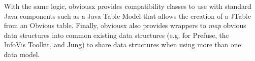 With the same logic, obviousx provides compatibility classes to use
with standard Java components such as a Java Table Model that allows
the creation of a JTable from an Obvious table.  Finally, obviousx
also provides wrappers to \emph{map} obvious data structures into
common existing data structures (e.g. for Prefuse, the InfoVis
Toolkit, and Jung) to share data structures when using more than one
data model.

